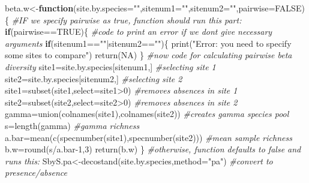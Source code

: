 \documentclass[
]{article}
\newenvironment{Shaded}{\begin{snugshade}}{\end{snugshade}}
\newcommand{\AttributeTok}[1]{\textcolor[rgb]{0.77,0.63,0.00}{#1}}
\newcommand{\CommentTok}[1]{\textcolor[rgb]{0.56,0.35,0.01}{\textit{#1}}}
\newcommand{\ConstantTok}[1]{\textcolor[rgb]{0.00,0.00,0.00}{#1}}
\newcommand{\ControlFlowTok}[1]{\textcolor[rgb]{0.13,0.29,0.53}{\textbf{#1}}}
\newcommand{\DecValTok}[1]{\textcolor[rgb]{0.00,0.00,0.81}{#1}}
\newcommand{\FunctionTok}[1]{\textcolor[rgb]{0.00,0.00,0.00}{#1}}
\newcommand{\NormalTok}[1]{#1}
\newcommand{\OtherTok}[1]{\textcolor[rgb]{0.56,0.35,0.01}{#1}}
\newcommand{\SpecialCharTok}[1]{\textcolor[rgb]{0.00,0.00,0.00}{#1}}
\newcommand{\StringTok}[1]{\textcolor[rgb]{0.31,0.60,0.02}{#1}}
\begin{document}
\begin{Shaded}
\begin{Highlighting}[]
\NormalTok{beta.w}\OtherTok{\textless{}{-}}\ControlFlowTok{function}\NormalTok{(}\AttributeTok{site.by.species=}\StringTok{""}\NormalTok{,}\AttributeTok{sitenum1=}\StringTok{""}\NormalTok{,}\AttributeTok{sitenum2=}\StringTok{""}\NormalTok{,}\AttributeTok{pairwise=}\ConstantTok{FALSE}\NormalTok{)\{}
  \CommentTok{\#IF we specify pairwise as true, function should run this part:}
  \ControlFlowTok{if}\NormalTok{(pairwise}\SpecialCharTok{==}\ConstantTok{TRUE}\NormalTok{)\{}
    \CommentTok{\#code to print an error if we don\textquotesingle{}t give necessary arguments}
    \ControlFlowTok{if}\NormalTok{(sitenum1}\SpecialCharTok{==}\StringTok{""}\SpecialCharTok{|}\NormalTok{sitenum2}\SpecialCharTok{==}\StringTok{""}\NormalTok{)\{}
      \FunctionTok{print}\NormalTok{(}\StringTok{"Error: you need to specify some sites to compare"}\NormalTok{)}
      \FunctionTok{return}\NormalTok{(}\ConstantTok{NA}\NormalTok{)}
\NormalTok{    \}}
    \CommentTok{\#now code for calculating pairwise beta diversity}
\NormalTok{    site1}\OtherTok{=}\NormalTok{site.by.species[sitenum1,] }\CommentTok{\#selecting site 1}
\NormalTok{    site2}\OtherTok{=}\NormalTok{site.by.species[sitenum2,] }\CommentTok{\#selecting site 2}
\NormalTok{    site1}\OtherTok{=}\FunctionTok{subset}\NormalTok{(site1,}\AttributeTok{select=}\NormalTok{site1}\SpecialCharTok{\textgreater{}}\DecValTok{0}\NormalTok{) }\CommentTok{\#removes absences in site 1}
\NormalTok{    site2}\OtherTok{=}\FunctionTok{subset}\NormalTok{(site2,}\AttributeTok{select=}\NormalTok{site2}\SpecialCharTok{\textgreater{}}\DecValTok{0}\NormalTok{) }\CommentTok{\#removes absences in site 2}
\NormalTok{    gamma}\OtherTok{=}\FunctionTok{union}\NormalTok{(}\FunctionTok{colnames}\NormalTok{(site1),}\FunctionTok{colnames}\NormalTok{(site2)) }\CommentTok{\#creates gamma species pool}
\NormalTok{    s}\OtherTok{=}\FunctionTok{length}\NormalTok{(gamma) }\CommentTok{\#gamma richness}
\NormalTok{    a.bar}\OtherTok{=}\FunctionTok{mean}\NormalTok{(}\FunctionTok{c}\NormalTok{(}\FunctionTok{specnumber}\NormalTok{(site1),}\FunctionTok{specnumber}\NormalTok{(site2))) }\CommentTok{\#mean sample richness}
\NormalTok{    b.w}\OtherTok{=}\FunctionTok{round}\NormalTok{(s}\SpecialCharTok{/}\NormalTok{a.bar}\DecValTok{{-}1}\NormalTok{,}\DecValTok{3}\NormalTok{)}
    \FunctionTok{return}\NormalTok{(b.w)}
\NormalTok{  \}}
  \CommentTok{\#otherwise, function defaults to false and runs this:}
\NormalTok{  SbyS.pa}\OtherTok{\textless{}{-}}\FunctionTok{decostand}\NormalTok{(site.by.species,}\AttributeTok{method=}\StringTok{"pa"}\NormalTok{) }\CommentTok{\#convert to presence/absence}

\end{Highlighting}
\end{Shaded}
\end{document}
